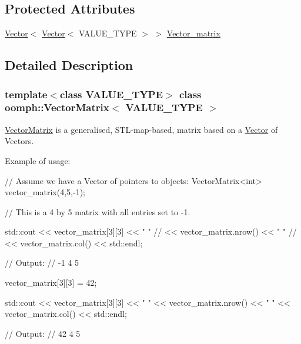 \subsection*{Protected Attributes}
\begin{DoxyCompactItemize}
\item 
\hyperlink{classoomph_1_1Vector}{Vector}$<$ \hyperlink{classoomph_1_1Vector}{Vector}$<$ V\+A\+L\+U\+E\+\_\+\+T\+Y\+PE $>$ $>$ \hyperlink{classoomph_1_1VectorMatrix_a3c91bd42a753ee7e82b9ba72f3288226}{Vector\+\_\+matrix}
\end{DoxyCompactItemize}


\subsection{Detailed Description}
\subsubsection*{template$<$class V\+A\+L\+U\+E\+\_\+\+T\+Y\+PE$>$\newline
class oomph\+::\+Vector\+Matrix$<$ V\+A\+L\+U\+E\+\_\+\+T\+Y\+P\+E $>$}

\hyperlink{classoomph_1_1VectorMatrix}{Vector\+Matrix} is a generalised, S\+T\+L-\/map-\/based, matrix based on a \hyperlink{classoomph_1_1Vector}{Vector} of Vectors.

Example of usage\+: 
\begin{DoxyCode}
     \textcolor{comment}{// Assume we have a Vector of pointers to objects:}
     VectorMatrix<int> vector\_matrix(4,5,-1);
    
     \textcolor{comment}{// This is a 4 by 5 matrix with all entries set to -1.}
   
     std::cout << vector\_matrix[3][3] << \textcolor{stringliteral}{" "}
\textcolor{comment}{//             << vector\_matrix.nrow() << " "}
\textcolor{comment}{//             << vector\_matrix.col() << std::endl;}
     
     \textcolor{comment}{// Output:}
     \textcolor{comment}{// -1 4 5}
     
     vector\_matrix[3][3] = 42;
     
     std::cout << vector\_matrix[3][3] << \textcolor{stringliteral}{" "}
               << vector\_matrix.nrow() << \textcolor{stringliteral}{" "}
               << vector\_matrix.col() << std::endl;
   
     \textcolor{comment}{// Output:}
     \textcolor{comment}{// 42 4 5}
\end{DoxyCode}
 

